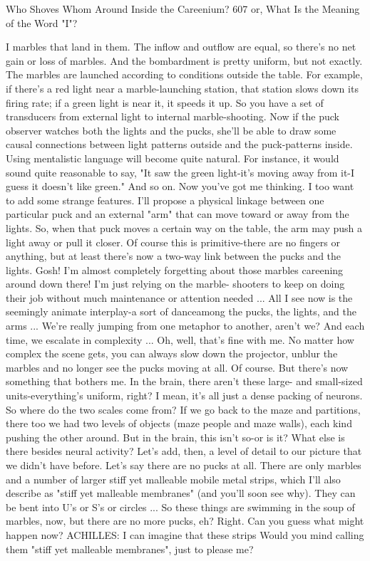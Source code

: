 Who Shoves Whom Around Inside the Careenium?                                        607
or, What Is the Meaning of the Word "I"?

I
  marbles that land in them. The inflow and outflow are equal, so there's no net gain
  or loss of marbles. And the bombardment is pretty uniform, but not exactly. The
  marbles are launched according to conditions outside the table. For example, if
  there's a red light near a marble-launching station, that station slows down its firing
  rate; if a green light is near it, it speeds it up. So you have a set of transducers from
  external light to internal marble-shooting. Now if the puck observer watches both
  the lights and the pucks, she'll be able to draw some causal connections between
  light patterns outside and the puck-patterns inside. Using mentalistic language will
  become quite natural. For instance, it would sound quite reasonable to say, "It saw
  the green light-it's moving away from it-I guess it doesn't like green." And so on.
\achilles Now you've got me thinking. I too want to add some strange features. I'll
  propose a physical linkage between one particular puck and an external "arm" that
  can move toward or away from the lights. So, when that puck moves a certain way
  on the table, the arm may push a light away or pull it closer. Of course this is
  primitive-there are no fingers or anything, but at least there's now a two-way link
  between the pucks and the lights. Gosh! I'm almost completely forgetting about
  those marbles careening around down there! I'm just relying on the marble-
  shooters to keep on doing their job without much maintenance or attention needed
  ... All I see now is the seemingly animate interplay-a sort of danceamong the
  pucks, the lights, and the arms ...
\tortoise We're really jumping from one metaphor to another, aren't we? And each
  time, we escalate in complexity ... Oh, well, that's fine with me. No matter how
  complex the scene gets, you can always slow down the projector, unblur the
  marbles and no longer see the pucks moving at all.
\achilles Of course. But there's now something that bothers me. In the brain, there
  aren't these large- and small-sized units-everything's uniform, right? I mean, it's all
  just a dense packing of neurons. So where do the two scales come from? If we go
  back to the maze and partitions, there too we had two levels of objects (maze
  people and maze walls), each kind pushing the other around. But in the brain, this
  isn't so-or is it? What else is there besides neural activity?
\tortoise Let's add, then, a level of detail to our picture that we didn't have before.
  Let's say there are no pucks at all. There are only marbles and a number of larger
  stiff yet malleable mobile metal strips, which I'll also describe as "stiff yet
  malleable membranes" (and you'll soon see why). They can be bent into U's or S's
  or circles ...
\achilles So these things are swimming in the soup of marbles, now, but there are
  no more pucks, eh?
\tortoise Right. Can you guess what might happen now? ACHILLES: I can
  imagine that these strips
\tortoise Would you mind calling them "stiff yet malleable membranes", just to
  please me?




